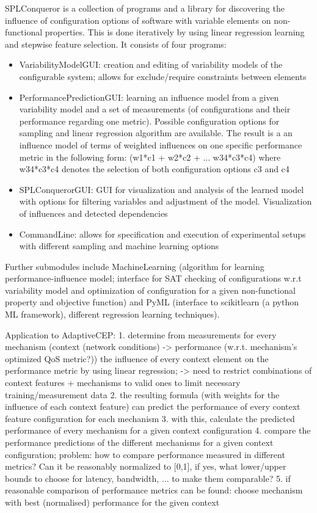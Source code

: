 SPLConqueror is a collection of programs and a library for discovering the influence of configuration options of software with variable elements on non-functional properties. This is done iteratively by using linear regression learning and stepwise feature selection. It consists of four programs: 
\begin{itemize}
\item VariabilityModelGUI: creation and editing of variability models of the configurable system; allows for exclude/require constraints between elements
\item PerformancePredictionGUI: learning an influence model from a given variability model and a set of measurements (of configurations and their performance regarding one metric). Possible configuration options for sampling and linear regression algorithm are available. The result is a an influence model of terms of weighted influences on one specific performance metric in the following form: (w1*c1 + w2*c2 + ... w34*c3*c4) where w34*c3*c4 denotes the selection of both configuration options c3 and c4
\item SPLConquerorGUI: GUI for visualization and analysis of the learned model with options for filtering variables and adjustment of the model. Visualization of influences and detected dependencies
\item CommandLine: allows for specification and execution of experimental setups with different sampling and machine learning options
\end{itemize}
 Further submodules include MachineLearning (algorithm for learning performance-influence model; interface for SAT checking of configurations w.r.t variability model and optimization of configuration for a given non-functional property and objective function) and PyML (interface to scikitlearn (a python ML framework), different regression learning techniques).
 
 Application to AdaptiveCEP: 
 1. determine from measurements for every mechanism (context (network conditions) -> performance (w.r.t. mechanism's optimized QoS metric?)) the influence of every context element on the performance metric by using linear regression; -> need to restrict combinations of context features + mechanisms to valid ones to limit necessary training/measurement data 
 2. the resulting formula (with weights for the influence of each context feature) can predict the performance of every context feature configuration for each mechanism 
 3. with this, calculate the predicted performance of every mechanism for a given context configuration
 4. compare the performance predictions of the different mechanisms for a given context configuration; problem: how to compare performance measured in different metrics? Can it be reasonably normalized to [0,1], if yes, what lower/upper bounds to choose for latency, bandwidth, ... to make them comparable?
 5. if reasonable comparison of performance metrics can be found: choose mechanism with best (normalised) performance for the given context

